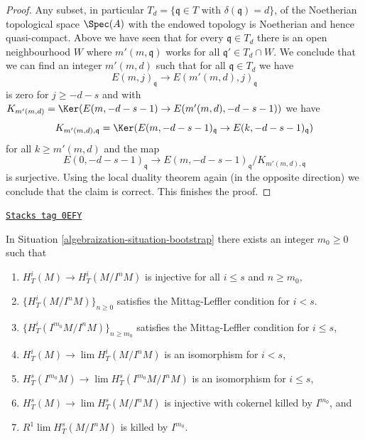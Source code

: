 \begin{proof}
\medskip\noindent
Any subset, in particular
$T_d = \{\mathfrak q \in T \text{ with }\delta(\mathfrak q) = d\}$,
of the Noetherian topological space $\Spec(A)$
with the endowed topology is Noetherian and hence quasi-compact.
Above we have seen that for every $\mathfrak q \in T_d$
there is an open neighbourhood $W$ where
$m'(m, \mathfrak q)$ works for all $\mathfrak q' \in T_d \cap W$.
We conclude that we can find an integer $m'(m, d)$ such that for all
$\mathfrak q \in T_d$ we have
$$
E(m, j)_\mathfrak q \to E(m'(m, d), j)_\mathfrak q
$$
is zero for $j \geq -d - s$ and with
$K_{m'(m, d)} = \Ker(E(m, -d - s - 1) \to E(m'(m, d), -d - s - 1))$
we have
$$
K_{m'(m, d), \mathfrak q} =
\Ker(E(m, -d - s - 1)_{\mathfrak q} \to E(k, -d - s - 1)_{\mathfrak q})
$$
for all $k \geq m'(m, d)$ and the map
$$
E(0, -d - s - 1)_\mathfrak q \to
E(m, -d - s - 1)_\mathfrak q/K_{m'(m, d), \mathfrak q}
$$
is surjective. Using the local duality theorem again (in the opposite
direction) we conclude that the claim is correct. This finishes the proof.
\end{proof}

\begin{lemma}
\label{algebraization-lemma-final-bootstrap}
\href{https://stacks.math.columbia.edu/tag/0EFY}{\texttt{Stacks tag 0EFY}}

In Situation \ref{algebraization-situation-bootstrap} there exists an integer $m_0 \geq 0$
such that
\begin{enumerate}
\item $H^i_T(M) \to H^i_T(M/I^nM)$ is injective for all $i \leq s$
and $n \geq m_0$,
\item $\{H^i_T(M/I^nM)\}_{n \geq 0}$
satisfies the Mittag-Leffler condition for $i < s$.
\item $\{H^i_T(I^{m_0}M/I^nM)\}_{n \geq m_0}$
satisfies the Mittag-Leffler condition for $i \leq s$,
\item $H^i_T(M) \to \lim H^i_T(M/I^nM)$
is an isomorphism for $i < s$,
\item $H^s_T(I^{m_0}M) \to \lim H^s_T(I^{m_0}M/I^nM)$
is an isomorphism for $i \leq s$,
\item $H^s_T(M) \to \lim H^s_T(M/I^nM)$ is
injective with cokernel killed by $I^{m_0}$, and
\item $R^1\lim H^s_T(M/I^nM)$ is killed by $I^{m_0}$.
\end{enumerate}
\end{lemma}

